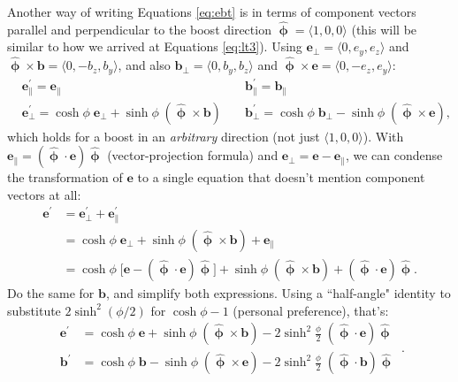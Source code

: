 \documentclass[12pt]{article}
\renewcommand{\vv}[1]{\mathbf{#1}}
\newcommand{\hatphi}{\bm{\hat{\upphi}}}
\begin{document}
Another way of writing Equations \ref{eq:ebt} is in terms of component vectors parallel and perpendicular to the boost direction $\hatphi = \langle 1, 0, 0 \rangle$ (this will be similar to how we arrived at Equations \ref{eq:lt3}). Using ${\vv e_\perp = \langle 0, e_y, e_z \rangle}$ and $\hatphi \times \vv b = \langle 0, -b_z, b_y \rangle$, and also $\vv b_\perp = \langle 0, b_y, b_z \rangle$ and $\hatphi \times \vv e = \langle 0, -e_z, e_y \rangle$:
\begin{equation}\label{eq:ebparperp}
\begin{aligned}
& \vv e^\prime_\parallel = \vv e_\parallel   & & \vv b^\prime_\parallel = \vv b_\parallel  \\
& \vv e^\prime_\perp =  \cosh{\phi} \; \vv e_\perp  +  \sinh{\phi} \; ( \hatphi \times \vv b )   \; & & \vv b^\prime_\perp = \cosh{\phi} \; \vv b_\perp  - \sinh{\phi} \; ( \hatphi \times \vv e ) ,
\end{aligned}
\end{equation}
which holds for a boost in an \emph{arbitrary} direction (not just $\langle 1, 0, 0 \rangle$). With $\vv e_\parallel = (\hatphi \cdot \vv e) \hatphi$ (vector-projection formula) and $\vv e_\perp = \vv e - \vv e_\parallel$, we can condense the transformation of $\vv e$ to a single equation that doesn't mention component vectors at all:
\begin{equation*}
\begin{split}
\vv e^\prime &= \vv e^\prime_\perp  + \vv e^\prime_\parallel \\
&= \cosh{\phi} \; \vv e_\perp  +  \sinh{\phi} \; ( \hatphi \times \vv b ) + \vv e_\parallel \\
&= \cosh{\phi} \; \big[ \vv e - (\hatphi \cdot \vv e) \hatphi \big] + \sinh{\phi} \; (\hatphi \times \vv b) + (\hatphi \cdot \vv e) \hatphi .
\end{split}
\end{equation*}
Do the same for $\vv b$, and simplify both expressions. Using a ``half-angle" identity to substitute $2 \sinh^2{(\phi/2)}$ for $\cosh{\phi} - 1$ (personal preference), that's:
\begin{equation}\label{eq:ebr}
\boxed{
\begin{aligned}
\vv e^\prime &= \cosh{\phi} \; \vv e + \sinh{\phi} \; (\hatphi \times \vv b) - 2 \sinh^2 \frac{\phi}{2} \; (\hatphi \cdot \vv e) \hatphi \\[4pt]
\vv b^\prime &= \cosh{\phi} \; \vv b - \sinh{\phi} \; (\hatphi \times \vv e) - 2 \sinh^2 \frac{\phi}{2} \; (\hatphi \cdot \vv b) \hatphi 
\end{aligned}
} \, .
\end{equation}
\end{document}
